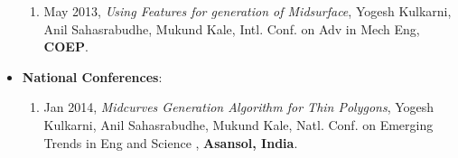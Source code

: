 \begin{itemize}[noitemsep,label=\textbullet, topsep=2pt,parsep=2pt,partopsep=2pt]
\begin{enumerate}[noitemsep, topsep=2pt,parsep=2pt,partopsep=2pt]
	\item  {May 2013},	\textit{Using Features for generation of Midsurface}, {Yogesh Kulkarni, Anil Sahasrabudhe, Mukund Kale},	 {Intl. Conf. on Adv in Mech Eng}, \textbf{COEP}.
	\end{enumerate}	
\item  \textbf{National Conferences}:
	\begin{enumerate}[noitemsep, topsep=2pt,parsep=2pt,partopsep=2pt]
	\item  {Jan 2014}, \textit{Midcurves Generation Algorithm for Thin Polygons}, {Yogesh Kulkarni, Anil Sahasrabudhe, Mukund Kale}, {Natl. Conf. on Emerging Trends in Eng and Science }, \textbf{Asansol, India}.
	\end{enumerate}		
\end{itemize}
